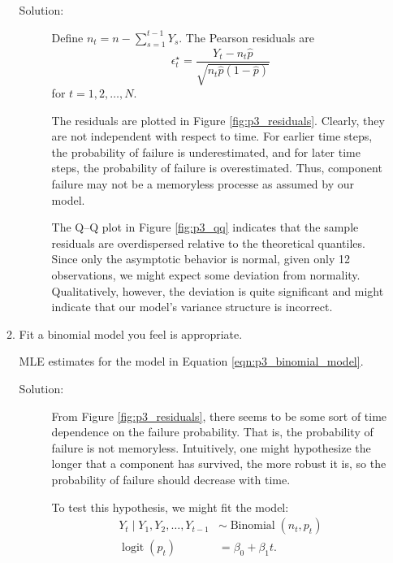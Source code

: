 \documentclass[letterpaper,11pt]{article}
\begin{document}
\begin{enumerate}
\begin{enumerate}
      \begin{description}        
      \item[Solution:] Define $n_t = n - \sum_{s=1}^{t-1} Y_s$. The Pearson
        residuals are
        \begin{equation}
          \epsilon_t^\star = \frac{Y_t - n_t\hat{p}}
          {\sqrt{n_t\hat{p}\left(1 - \hat{p}\right)}}
          \label{eqn:p3_pearson_residual}          
        \end{equation}
        for $t = 1,2,\ldots,N$.

        The residuals are plotted in Figure \ref{fig:p3_residuals}. Clearly,
        they are not independent with respect to time. For earlier time steps,
        the probability of failure is underestimated, and for later time steps,
        the probability of failure is overestimated. Thus, component failure may
        not be a memoryless processe as assumed by our model.

        The Q--Q plot in Figure \ref{fig:p3_qq} indicates that the sample
        residuals are overdispersed relative to the theoretical quantiles. Since
        only the asymptotic behavior is normal, given only 12 observations, we
        might expect some deviation from normality. Qualitatively, however, the
        deviation is quite significant and might indicate that our model's
        variance structure is incorrect.
      \end{description}
    \item Fit a binomial model you feel is appropriate.
      \begin{table}
        \centering
        
        \caption{MLE estimates for the model in Equation
          \ref{eqn:p3_binomial_model}.}
        \label{tab:p3_model_summary}
      \end{table}
      
      \begin{description}
      \item[Solution:] From Figure \ref{fig:p3_residuals}, there seems to be
        some sort of time dependence on the failure probability. That is, the
        probability of failure is not memoryless. Intuitively, one might
        hypothesize the longer that a component has survived, the more robust
        it is, so the probability of failure should decrease with time.

        To test this hypothesis, we might fit the model:
        \begin{align}
          Y_t \mid Y_1,Y_2,\ldots, Y_{t-1}
          &\sim \operatorname{Binomial}\left(n_t, p_t\right)
          \label{eqn:p3_binomial_model} \\
          \operatorname{logit}\left(p_t\right)
          &= \beta_0 + \beta_1t. \nonumber
        \end{align}


\end{description}
\end{enumerate}
\end{enumerate}
\end{document}

